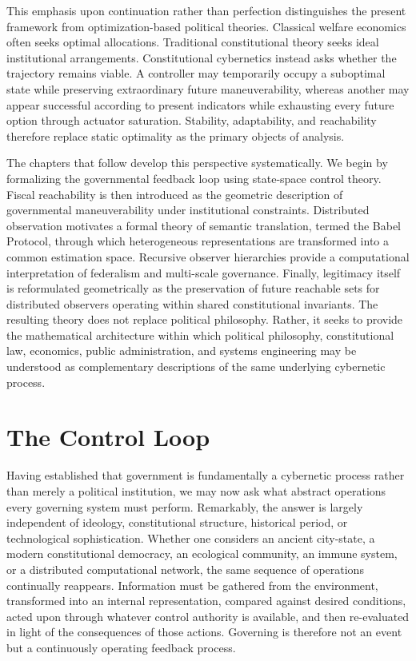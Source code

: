 \documentclass[12pt,a4paper]{article}
\begin{document}
This emphasis upon continuation rather than perfection distinguishes the present framework from optimization-based political theories. Classical welfare economics often seeks optimal allocations. Traditional constitutional theory seeks ideal institutional arrangements. Constitutional cybernetics instead asks whether the trajectory remains viable. A controller may temporarily occupy a suboptimal state while preserving extraordinary future maneuverability, whereas another may appear successful according to present indicators while exhausting every future option through actuator saturation. Stability, adaptability, and reachability therefore replace static optimality as the primary objects of analysis.

The chapters that follow develop this perspective systematically. We begin by formalizing the governmental feedback loop using state-space control theory. Fiscal reachability is then introduced as the geometric description of governmental maneuverability under institutional constraints. Distributed observation motivates a formal theory of semantic translation, termed the Babel Protocol, through which heterogeneous representations are transformed into a common estimation space. Recursive observer hierarchies provide a computational interpretation of federalism and multi-scale governance. Finally, legitimacy itself is reformulated geometrically as the preservation of future reachable sets for distributed observers operating within shared constitutional invariants. The resulting theory does not replace political philosophy. Rather, it seeks to provide the mathematical architecture within which political philosophy, constitutional law, economics, public administration, and systems engineering may be understood as complementary descriptions of the same underlying cybernetic process.

\section{The Control Loop}

Having established that government is fundamentally a cybernetic process rather than merely a political institution, we may now ask what abstract operations every governing system must perform. Remarkably, the answer is largely independent of ideology, constitutional structure, historical period, or technological sophistication. Whether one considers an ancient city-state, a modern constitutional democracy, an ecological community, an immune system, or a distributed computational network, the same sequence of operations continually reappears. Information must be gathered from the environment, transformed into an internal representation, compared against desired conditions, acted upon through whatever control authority is available, and then re-evaluated in light of the consequences of those actions. Governing is therefore not an event but a continuously operating feedback process.
\end{document}
